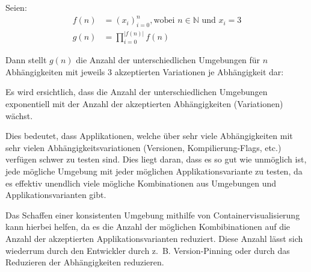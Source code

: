 Seien:
\begin{align*}
    f(n) &= (x_i)_{i=0}^{n}, \text{wobei } n \in \mathbb{N} \text{ und } x_i = 3 \\
    g(n) &= \prod_{i=0}^{|f(n)|} f(n)
\end{align*}

Dann stellt $g(n)$ die Anzahl der unterschiedlichen Umgebungen für $n$ Abhängigkeiten mit jeweils 3 akzeptierten Variationen je Abhängigkeit dar:


Es wird ersichtlich, dass die Anzahl der unterschiedlichen Umgebungen exponentiell mit der Anzahl der akzeptierten Abhängigkeiten (Variationen) wächst. 

Dies bedeutet, dass Applikationen, welche über sehr viele Abhängigkeiten mit sehr vielen Abhängigkeitsvariationen (Versionen, Kompilierung-Flags, etc.) verfügen schwer zu testen sind. Dies liegt daran, dass es so gut wie unmöglich ist, jede mögliche Umgebung mit jeder möglichen Applikationsvariante zu testen, da es effektiv unendlich viele mögliche Kombinationen aus Umgebungen und Applikationsvarianten gibt.

Das Schaffen einer konsistenten Umgebung mithilfe von Containervisualisierung kann hierbei helfen, da es die Anzahl der möglichen Kombibinationen auf die Anzahl der akzeptierten Applikationsvarianten reduziert. Diese Anzahl lässt sich wiederrum durch den Entwickler durch z. B. Version-Pinning oder durch das Reduzieren der Abhängigkeiten reduzieren.